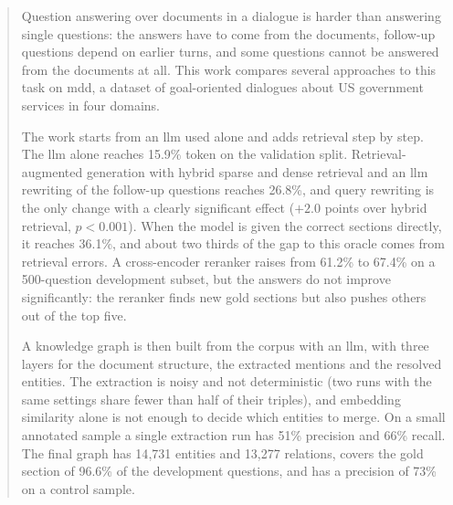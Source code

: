 
\begin{abstract}

Question answering over documents in a dialogue is harder than answering single
questions: the answers have to come from the documents, follow-up questions depend on
earlier turns, and some questions cannot be answered from the documents at all. This
work compares several approaches to this task on \gls{mdd}, a dataset of goal-oriented
dialogues about US government services in four domains.

The work starts from an \gls{llm} used alone and adds retrieval step by step. The
\gls{llm} alone reaches 15.9\% token \fone{} on the validation split. Retrieval-augmented
generation with hybrid sparse and dense retrieval and an \gls{llm} rewriting of the
follow-up questions reaches 26.8\%, and query rewriting is the only change with a clearly
significant effect ($+2.0$ points over hybrid retrieval, $p < 0.001$). When the model is
given the correct sections directly, it reaches 36.1\%, and about two thirds of the gap
to this oracle comes from retrieval errors. A cross-encoder reranker raises  from
61.2\% to 67.4\% on a 500-question development subset, but the answers do not improve
significantly: the reranker finds new gold sections but also pushes others out of the
top five.

A knowledge graph is then built from the corpus with an \gls{llm}, with three layers for
the document structure, the extracted mentions and the resolved entities. The extraction
is noisy and not deterministic (two runs with the same settings share fewer than half of
their triples), and embedding similarity alone is not enough to decide which entities to
merge. On a small annotated sample a single extraction run has 51\% precision and 66\%
recall. The final graph has 14{,}731 entities and 13{,}277 relations, covers the gold
section of 96.6\% of the development questions, and has a precision of 73\% on a control
sample.


\end{abstract}
